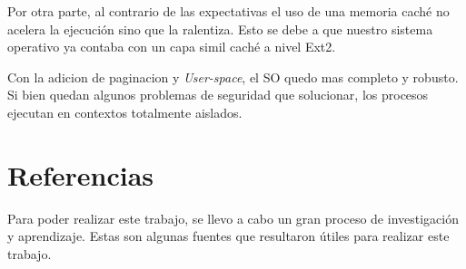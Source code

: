 \documentclass[a4paper,10pt]{article}
\begin{document}
Por otra parte, al contrario de las expectativas el uso de una memoria caché no acelera la ejecución sino que la ralentiza. Esto se
debe a que nuestro sistema operativo ya contaba con un capa simil caché a nivel Ext2. 

Con la adicion de paginacion y \textit{User-space}, el SO quedo mas completo y robusto.
Si bien quedan algunos problemas de seguridad que solucionar, los procesos ejecutan en contextos totalmente aislados.

\newpage     
\section{Referencias}

Para poder realizar este trabajo, se llevo a cabo un gran proceso de investigación y aprendizaje. Estas son algunas fuentes que resultaron útiles para realizar 
este trabajo.\\
\end{document}
